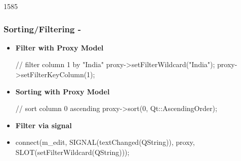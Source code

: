 \begin{slide}[fragile]{1585}\frametitle{Sorting/Filtering - }
  \begin{itemize}
  \item \textbf{Filter with Proxy Model}
\begin{cpp}
// filter column 1 by "India"
proxy->setFilterWildcard("India");
proxy->setFilterKeyColumn(1); 
\end{cpp}
\item \textbf{Sorting with Proxy Model}
\begin{cpp}
// sort column 0 ascending
proxy->sort(0, Qt::AscendingOrder);
\end{cpp}
  \end{itemize}
\medskip
\begin{itemize}
\item \textbf{Filter via  signal}
\item[]
\begin{cpp}
connect(m_edit, SIGNAL(textChanged(QString)),
        proxy, SLOT(setFilterWildcard(QString)));
\end{cpp}
\end{itemize}
\end{slide}

